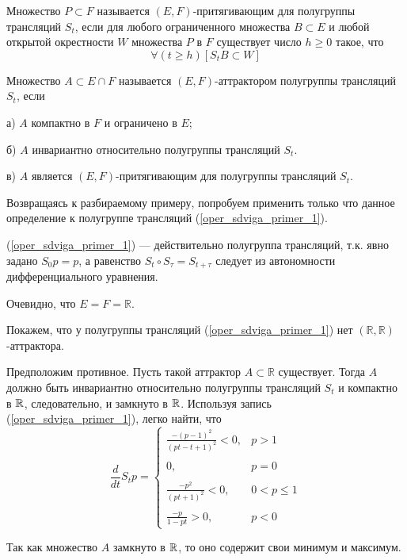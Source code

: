\opred

Множество $P \subset F$ называется $(E,F)$-притягивающим для полугруппы трансляций $S_t$,
если для любого ограниченного множества $B \subset E$ и любой открытой окрестности $W$ множества $P$ в $F$ существует число $h\geq 0$ такое, что
$$
	\forall(t \geq h)[S_t B \subset W]
$$


\opred

Множество $A\subset E\cap F$ называется $(E,F)$-аттрактором полугруппы трансляций $S_t$, если

а) $A$ компактно в $F$ и ограничено в $E$;

б) $A$ инвариантно относительно полугруппы трансляций $S_t$.

в) $A$ является $(E,F)$-притягивающим для полугруппы трансляций $S_t$.


Возвращаясь к разбираемому примеру, попробуем применить только что данное определение к полугруппе трансляций (\ref{oper_sdviga_primer_1}).

(\ref{oper_sdviga_primer_1}) --- действительно полугруппа трансляций, т.к. явно задано $S_0 p = p$, а равенство $S_t \circ S_\tau = S_{t+\tau}$ следует из автономности дифференциального уравнения.

Очевидно, что $E=F=\mathbb{R}$.

Покажем, что у полугруппы трансляций (\ref{oper_sdviga_primer_1}) нет $(\mathbb{R},\mathbb{R})$-аттрактора.

Предположим противное.
Пусть такой аттрактор $A \subset \mathbb{R}$ существует.
Тогда $A$ должно быть инвариантно относительно полугруппы трансляций $S_t$ и компактно в $\mathbb{R}$, следовательно, и замкнуто в $\mathbb{R}$.
Используя запись (\ref{oper_sdviga_primer_1}), легко найти, что
\begin{equation}\label{oper_sdviga_primer_1_proizv}
	\frac{d}{dt}S_t p =
	\left\{
		\begin{array}{ll}
			\frac{-(p-1)^2}{(pt-t+1)^2} < 0, & p > 1
		\\\\
			0,        & p = 0
		\\\\
			\frac{-p^2}{(pt+1)^2} < 0,        & 0 < p \leq 1
		\\\\
			\frac{-p}{1 - pt} > 0,      & p < 0
		\end{array}
	\right.
\end{equation}

Так как множество $A$ замкнуто в $\mathbb{R}$, то оно содержит свои минимум и максимум.

